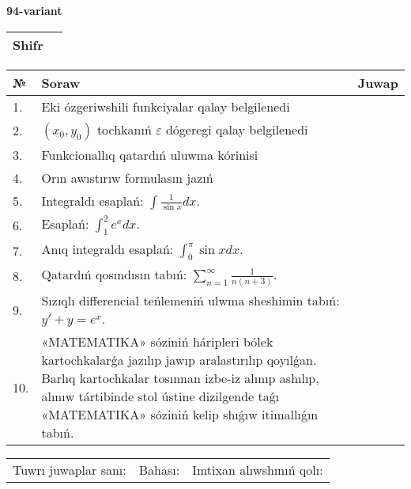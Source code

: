 \documentclass{article}
\begin{document}
  \egroup
  
  \newpage
  
  
  \textbf{94-variant}\\
  
  \bgroup
  \def\arraystretch{1.6} %
  
  \begin{tabular}{|m{5.7cm}|m{9.5cm}|}
  \hline
  Shifr & \\
  \hline
  \end{tabular}
  
  \vspace{1cm}
  
  \begin{tabular}{|m{0.7cm}|m{10cm}|m{4cm}|}
  \hline
  № & Soraw & Juwap \\
  \hline
  1. & Eki ózgeriwshili funkciyalar qalay belgilenedi &  \\
  \hline
  2. & \((x_0,y_0)\) tochkanıń \(\varepsilon\) dógeregi qalay belgilenedi &  \\
  \hline
  3. & Funkcionallıq qatardıń uluwma kórinisi &  \\
  \hline
  4. & Orın awıstırıw formulasın jazıń &  \\
  \hline
  5. & Integraldı esaplań: \(\int{\frac{1}{\sin x}dx}\). &  \\
  \hline
  6. & Esaplań: \(\int_{1}^2 {e^{x}dx}\). &  \\
  \hline
  7. & Anıq integraldı esaplań: \(\int_{0}^{\pi}{\sin xdx}\). &  \\
  \hline
  8. & Qatardıń qosındısın tabıń: \(\sum_{n = 1}^{\infty}\frac{1}{n(n + 3)}\). &  \\
  \hline
  9. & Sızıqlı differencial teńlemeniń ulwma sheshimin tabıń: \(y' + y = e^{x}\). &  \\
  \hline
  10. & «MATEMATIKA» sóziniń háripleri bólek kartochkalarǵa jazılıp jawıp aralastırılıp qoyılǵan. Barlıq kartochkalar tosınnan izbe-iz alınıp ashılıp, alınıw tártibinde stol ústine dizilgende taǵı «MATEMATIKA» sóziniń kelip shıǵıw itimallıǵın tabıń. &  \\
  \hline
  \end{tabular}
  
  \vspace{1cm}
  
  \begin{tabular}{lll}
  Tuwrı juwaplar sanı: \underline{\hspace{1.5cm}} & 
  Bahası: \underline{\hspace{1.5cm}} & 
  Imtixan alıwshınıń qolı: \underline{\hspace{2cm}} \\
  \end{tabular}
  
\end{document}
